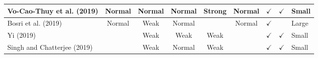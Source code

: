 \documentclass[../access.tex]{subfiles}
\begin{document}
\begin{table}[htbp]
\begin{adjustwidth}{-1cm}{}
\begin{tabular}{m{4.4cm} c c c c c c c >{\centering\arraybackslash}m{0.7cm}}
            \hline
            \footnotesize{Vo-Cao-Thuy et al. (2019) \cite{Vo-Cao-Thuy2019}}     & {Normal}                                                                                          & {Normal}                                         & {Normal}               & {Strong}                     & {Normal}                  & $ \checkmark $          & $ \checkmark $            & \footnotesize{Small} \\
            \hline
            \footnotesize{Bosri et al. (2019) \cite{Bosri2019}}                 & {Normal}                                                                                          & {Weak}                                           & {Normal}               & {}                           & {Normal}                  & $ \checkmark $          & {}                        & \footnotesize{Large} \\
            \hline
            \footnotesize{Yi (2019) \cite{Yi2019}}                              & {}                                                                                                & {Weak}                                           & {Weak}                 & {Weak}                       & {}                        & $ \checkmark $          & $ \checkmark $            & \footnotesize{Small} \\
            \hline
            \footnotesize{Singh and Chatterjee (2019) \cite{Singh2019}}         & {}                                                                                                & {Weak}                                           & {Normal}               & {Weak}                       & {}                        & $ \checkmark $          & $ \checkmark $            & \footnotesize{Small} \\
            \bottomrule
        \end{tabular}
    \end{adjustwidth}
    \label{tbl:table3}
\end{table}
\end{document}
